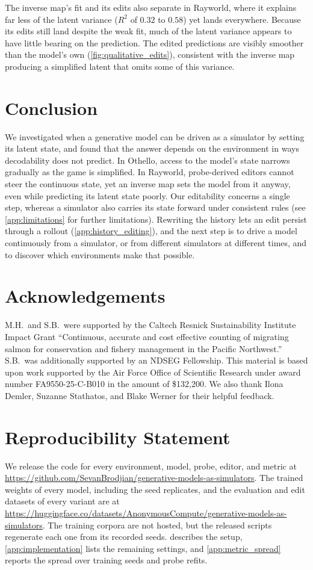 \documentclass{article} %
\begin{document}
The inverse map's fit and its edits also separate in Rayworld, where it explains far less of the latent variance ($R^2$ of $0.32$ to $0.58$) yet lands everywhere. Because its edits still land despite the weak fit, much of the latent variance appears to have little bearing on the prediction. The edited predictions are visibly smoother than the model's own (\cref{fig:qualitative_edits}), consistent with the inverse map producing a simplified latent that omits some of this variance.


\section{Conclusion}
We investigated when a generative model can be driven as a simulator by setting its latent state, and found that the answer depends on the environment in ways decodability does not predict. In Othello, access to the model's state narrows gradually as the game is simplified. In Rayworld, probe-derived editors cannot steer the continuous state, yet an inverse map sets the model from it anyway, even while predicting its latent state poorly. Our editability concerns a single step, whereas a simulator also carries its state forward under consistent rules (see \cref{app:limitations} for further limitations). Rewriting the history lets an edit persist through a rollout (\cref{app:history_editing}), and the next step is to drive a model continuously from a simulator, or from different simulators at different times, and to discover which environments make that possible.

\newpage
\section{Acknowledgements}
\label{sec:acknowledgements}
M.H.\ and S.B.\ were supported by the Caltech Resnick Sustainability Institute Impact Grant ``Continuous, accurate and cost effective counting of migrating salmon for conservation and fishery management in the Pacific Northwest.'' S.B.\ was additionally supported by an NDSEG Fellowship. This material is based upon work supported by the Air Force Office of Scientific Research under award number FA9550-25-C-B010 in the amount of \$132,200. We also thank Ilona Demler, Suzanne Stathatos, and Blake Werner for their helpful feedback.

\section{Reproducibility Statement}
\label{sec:reproducibility}
We release the code for every environment, model, probe, editor, and metric at \url{https://github.com/SevanBrodjian/generative-models-as-simulators}. The trained weights of every model, including the seed replicates, and the evaluation and edit datasets of every variant are at \url{https://huggingface.co/datasets/AnonymousCompute/generative-models-as-simulators}. The training corpora are not hosted, but the released scripts regenerate each one from its recorded seeds.  describes the setup, \cref{app:implementation} lists the remaining settings, and \cref{app:metric_spread} reports the spread over training seeds and probe refits.
\end{document}
